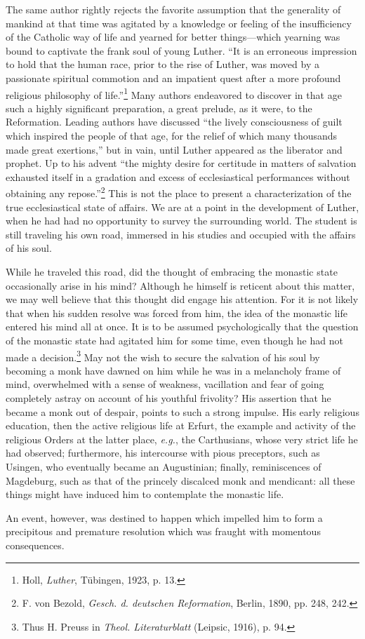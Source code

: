 The same author rightly rejects the favorite assumption that the
generality of mankind at that time was agitated by a knowledge
or feeling of the insufficiency of the Catholic way of life and
yearned for better things—which yearning was bound to captivate the frank soul of young Luther. “It is an erroneous
impression to hold that the human race, prior to the rise of Luther,
was moved by a passionate spiritual commotion and an impatient
quest after a more profound religious philosophy of life.”\footnote{Holl, \textit{Luther}, Tübingen, 1923, p. 13.}
Many
authors endeavored to discover in that age such a highly significant
preparation, a great prelude, as it were, to the Reformation. Leading authors have discussed “the lively consciousness of guilt which
inspired the people of that age, for the relief of which many thousands made great exertions,” but in vain, until Luther appeared as the liberator and prophet. Up to his advent “the mighty desire
for certitude in matters of salvation exhausted itself in a gradation
and excess of ecclesiastical performances without obtaining
any repose.”\footnote{F. von Bezold, \textit{Gesch. d. deutschen Reformation}, Berlin, 1890, pp. 248, 242.}
This is not the place to present a characterization
of the true ecclesiastical state of affairs. We are at a point in the
development of Luther, when he had had no opportunity to survey
the surrounding world. The student is still traveling his own road,
immersed in his studies and occupied with the affairs of his soul.

While he traveled this road, did the thought of embracing the
monastic state occasionally arise in his mind? Although he himself
is reticent about this matter, we may well believe that this thought
did engage his attention. For it is not likely that when his sudden
resolve was forced from him, the idea of the monastic life entered
his mind all at once. It is to be assumed psychologically that the
question of the monastic state had agitated him for some time,
even though he had not made a decision.\footnote{Thus H. Preuss in \textit{Theol. Literaturblatt} (Leipsic, 1916), p. 94.}
May not the wish to secure the salvation of his soul by becoming a monk have dawned on
him while he was in a melancholy frame of mind, overwhelmed
with a sense of weakness, vacillation and fear of going completely
astray on account of his youthful frivolity? His assertion that he
became a monk out of despair, points to such a strong impulse. His
early religious education, then the active religious life at Erfurt,
the example and activity of the religious Orders at the latter
place, \textit{e.g.}, the Carthusians, whose very strict life he had observed;
furthermore, his intercourse with pious preceptors, such as Usingen,
who eventually became an Augustinian; finally, reminiscences of
Magdeburg, such as that of the princely discalced monk and mendicant: all these things might have induced him to contemplate the
monastic life.

An event, however, was destined to happen which impelled him to
form a precipitous and premature resolution which was fraught
with momentous consequences.
